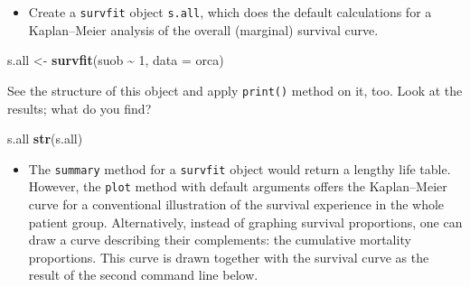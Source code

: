 \documentclass[
]{book}
\newenvironment{Shaded}{\begin{snugshade}}{\end{snugshade}}
\newcommand{\AttributeTok}[1]{\textcolor[rgb]{0.13,0.29,0.53}{#1}}
\newcommand{\DecValTok}[1]{\textcolor[rgb]{0.00,0.00,0.81}{#1}}
\newcommand{\FunctionTok}[1]{\textcolor[rgb]{0.13,0.29,0.53}{\textbf{#1}}}
\newcommand{\NormalTok}[1]{#1}
\newcommand{\OtherTok}[1]{\textcolor[rgb]{0.56,0.35,0.01}{#1}}
\newcommand{\SpecialCharTok}[1]{\textcolor[rgb]{0.81,0.36,0.00}{\textbf{#1}}}
\providecommand{\tightlist}{%
  \setlength{\itemsep}{0pt}\setlength{\parskip}{0pt}}
\begin{document}
\begin{Shaded}
\end{Shaded}

\begin{itemize}
\tightlist
\item
  Create a \texttt{survfit} object \texttt{s.all}, which does the
  default calculations for a Kaplan--Meier
  analysis of the overall (marginal) survival curve.
\end{itemize}

\begin{Shaded}
\begin{Highlighting}[]
\NormalTok{s.all }\OtherTok{\textless{}{-}} \FunctionTok{survfit}\NormalTok{(suob }\SpecialCharTok{\textasciitilde{}} \DecValTok{1}\NormalTok{, }\AttributeTok{data =}\NormalTok{ orca)}
\end{Highlighting}
\end{Shaded}

See the structure of this object and apply \texttt{print()} method on it, too.
Look at the results; what do you find?

\begin{Shaded}
\begin{Highlighting}[]
\NormalTok{s.all}
\FunctionTok{str}\NormalTok{(s.all)}
\end{Highlighting}
\end{Shaded}

\begin{itemize}
\tightlist
\item
  The \texttt{summary} method for
  a \texttt{survfit} object would return a lengthy life table.
  However, the \texttt{plot} method with default
  arguments offers the Kaplan--Meier curve
  for a conventional illustration of the survival experience in the whole patient group.
  Alternatively, instead of graphing survival proportions,
  one can draw a curve describing their complements: the cumulative mortality proportions. This curve is drawn together with the survival curve as the
  result of the second command line below.
\end{itemize}
\end{document}
